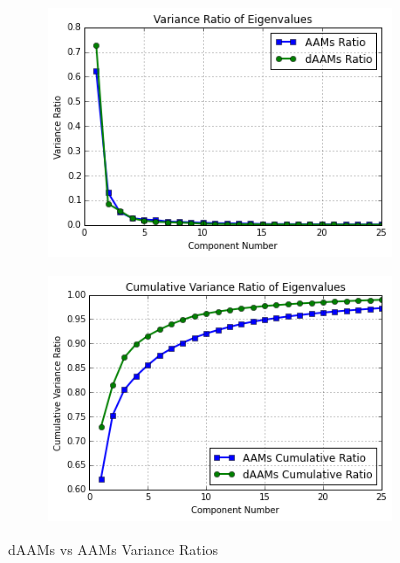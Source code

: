 \begin{figure}[!t]
    \centering
    \begin{subfigure}[b]{0.4\textwidth}
            \includegraphics[width=\textwidth]{supports/Model_Analysis/variance_ratio}
    \end{subfigure}
    \begin{subfigure}[b]{0.4\textwidth}
            \includegraphics[width=\textwidth]{supports/Model_Analysis/cumulative_variance_ratio}
    \end{subfigure}
    \caption{dAAMs vs AAMs Variance Ratios}
    \label{fig:compact}
\end{figure}


